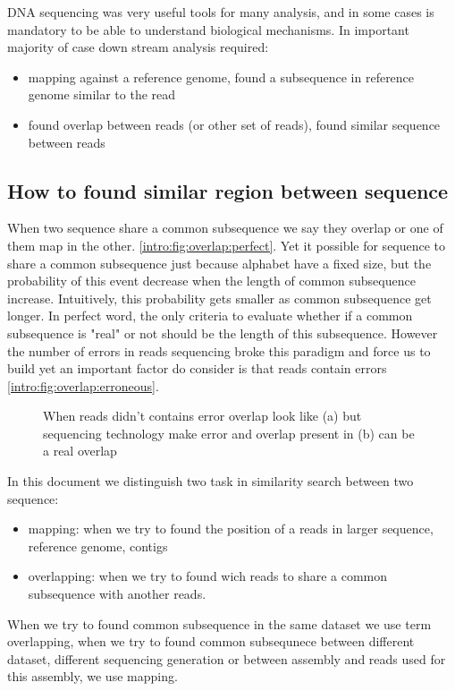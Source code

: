 \documentclass[./main.tex]{subfiles}
\begin{document}
DNA sequencing was very useful tools for many analysis, and in some cases is mandatory to be able to understand biological mechanisms. 
In important majority of case down stream analysis required:
\begin{itemize}
    \item mapping against a reference genome, found a subsequence in reference genome similar to the read
    \item found overlap between reads (or other set of reads), found similar sequence between reads 
\end{itemize}
 
\subsection{How to found similar region between sequence} 

When two sequence share a common subsequence we say they overlap or one of them map in the other. \ref{intro:fig:overlap:perfect}. Yet it possible for sequence to share a common subsequence just because alphabet have a fixed size, but the probability of this event decrease when the length of common subsequence increase. Intuitively, this probability gets smaller as common subsequence get longer. In perfect word, the only criteria to evaluate whether if a common subsequence is "real" or not should be the length of this subsequence. However the number of errors in reads sequencing broke this paradigm and force us to build yet an important factor do consider is that reads contain errors \ref{intro:fig:overlap:erroneous}.

\begin{figure}[ht]
    \centering
    \caption{When reads didn't contains error overlap look like (a) but sequencing technology make error and overlap present in (b) can be a real overlap}
    \label{intro:fig:overlap}
\end{figure}

In this document we distinguish two task in similarity search between two sequence:
\begin{itemize}
    \item mapping: when we try to found the position of a reads in larger sequence, reference genome, contigs
    \item overlapping: when we try to found wich reads to share a common subsequence with another reads. 
\end{itemize}
When we try to found common subsequence in the same dataset we use term overlapping, when we try to found common subsequnece between different dataset, different sequencing generation or between assembly and reads used for this assembly, we use mapping.
\end{document}
